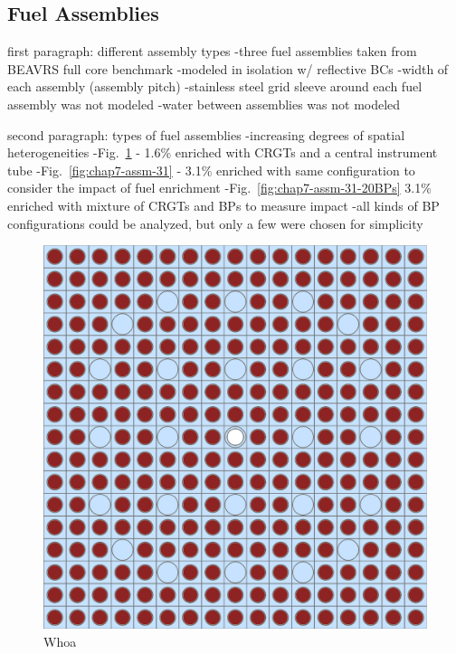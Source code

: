 \subsection{Fuel Assemblies}
\label{subsec:chap7-fuel-assms}

first paragraph: different assembly types
-three fuel assemblies taken from \ac{BEAVRS} full core benchmark
  -modeled in isolation w/ reflective BCs
-width of each assembly (assembly pitch)
-stainless steel grid sleeve around each fuel assembly was not modeled
-water between assemblies was not modeled

second paragraph: types of fuel assemblies
-increasing degrees of spatial heterogeneities
-Fig.~\ref{fig:chap7-assm-16} - 1.6\% enriched with \ac{CRGT}s and a central instrument tube
-Fig.~\ref{fig:chap7-assm-31} - 3.1\% enriched with same configuration to consider the impact of fuel enrichment
-Fig.~\ref{fig:chap7-assm-31-20BPs} 3.1\% enriched with mixture of \ac{CRGT}s and \ac{BP}s to measure impact
-all kinds of \ac{BP} configurations could be analyzed, but only a few were chosen for simplicity

\begin{figure}[h!]
  \centering
  \includegraphics[width=0.65\linewidth]{figures/benchmarks/assembly-16}
\caption[BEAVRS 1.6\% enriched assembly]{Whoa}
\label{fig:chap7-assm-16}
\end{figure}

